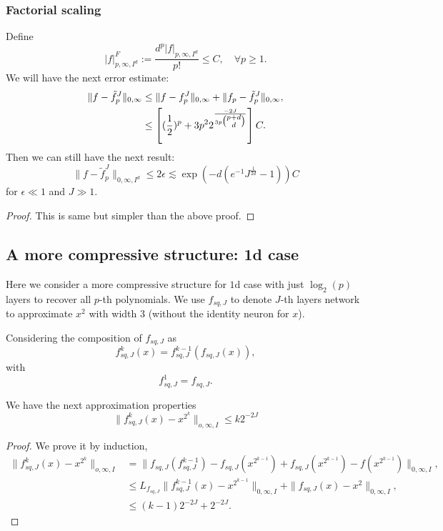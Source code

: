 \subsubsection{Factorial scaling}
Define
$$
|f|^F_{p,\infty,I^d} := \frac{d^p|f|_{p,\infty,I^d}}{p!} \le C, \quad \forall p \ge 1.
$$
We will have the next error estimate:
\begin{align}
\|f- \tilde f^J_p\|_{0,\infty} &\le \|f - f^J_p\|_{0,\infty} + \|f_p - \tilde f^J_p\|_{0,\infty}, \\
&\le \left[  (\frac{1}{2})^p +3p^2 2^{\frac{-2J}{3p\tbinom{p+d}{d}}}\right] C.
\end{align}
Then we can still have the next result:
\begin{equation}
\|f- \tilde f^J_p\|_{0,\infty, I^d}  \le 2\epsilon \lesssim \exp(-d(e^{-1}J^{\frac{1}{2d}} - 1))C
\end{equation}
for $\epsilon \ll 1$ and $J \gg1$.
\begin{proof}
	This is same but simpler than the above proof.
	\end{proof}
\newpage
\subsection{A more compressive structure: 1d case}
Here we consider a more compressive structure for $1$d case with just $\log_2(p)$ layers to recover all $p$-th polynomials. 
We use $f_{sq,J}$ to denote $J$-th layers network to approximate $x^2$ with width $3$ (without the identity neuron for $x$).

Considering the composition of $f_{sq,J}$ as
$$
f^k_{sq,J}(x) = f^{k-1}_{sq, J}(f_{sq,J}(x)),
$$
with
$$
f^1_{sq,J} = f_{sq,J}.
$$

\begin{properties}
	We have the next approximation properties
	$$
	\|f^k_{sq,J}(x) - x^{2^k} \|_{o,\infty, I} \le k2^{-2J}
	$$
\end{properties}
\begin{proof}We prove it by induction, 
	\begin{align}
	\|f^k_{sq,J}(x) - x^{2^k} \|_{o,\infty, I} &= \|f_{sq,J}(f^{k-1}_{sq,J}) - f_{sq,J}(x^{2^{k-1}}) +f_{sq,J}(x^{2^{k-1}}) - f(x^{2^{k-1}}) \|_{0,\infty,I}, \\
	&\le L_{f_{sq,J}} \|f^{k-1}_{sq,J}(x) - x^{2^{k-1}}\|_{0, \infty, I} + \|f_{sq,J}(x) - x^2\|_{0,\infty,I}, \\
	&\le (k-1)2^{-2J} + 2^{-2J}.
	\end{align}
	
	
	\end{proof}

